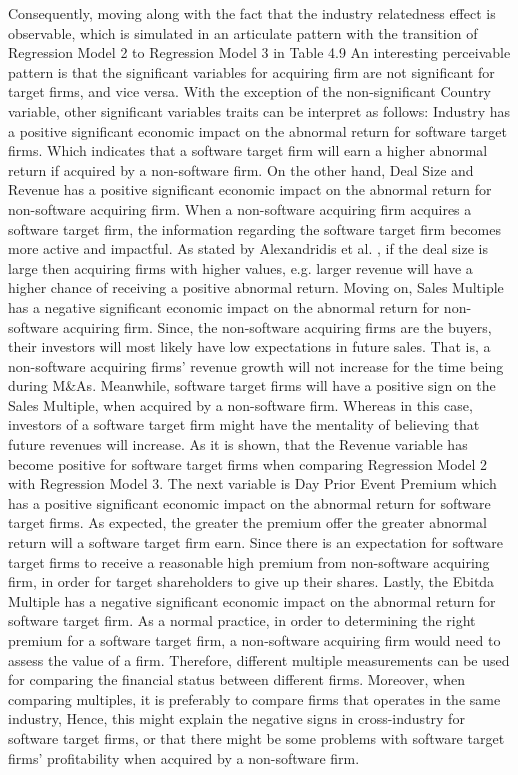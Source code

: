 \documentclass[preprint,10pt]{elsarticle}
\begin{document}
Consequently, moving along with the fact that the industry relatedness effect is observable, which is simulated in an articulate pattern with the transition of Regression Model 2 to Regression Model 3 in Table 4.9 An interesting perceivable pattern is that the significant variables for acquiring firm are not significant for target firms, and vice versa. With the exception of the non-significant Country variable, other significant variables traits can be interpret as follows: Industry  has a positive significant economic impact on the abnormal return for software target firms. Which indicates that a software target firm will earn a higher abnormal return if acquired by a non-software firm. On the other hand, Deal Size and Revenue  has a positive significant economic impact on the abnormal return for non-software acquiring firm. When a non-software acquiring firm acquires a software target firm, the information regarding the software target firm becomes more active and impactful. As stated by Alexandridis et al. \cite{ALEXANDRIDIS2017}, if the deal size is large then acquiring firms with higher values, e.g. larger revenue will have a higher chance of receiving a positive abnormal return. Moving on, Sales Multiple  has a negative significant economic impact on the abnormal return for non-software acquiring firm. Since, the non-software acquiring firms are the buyers, their investors will most likely have low expectations in future sales. That is, a non-software acquiring firms' revenue growth will not increase for the time being during M\&As. Meanwhile, software target firms will have a positive sign on the Sales Multiple, when acquired by a non-software firm. Whereas in this case, investors of a software target firm might have the mentality of believing that future revenues will increase. As it is shown, that the Revenue variable has become positive for software target firms when comparing Regression Model 2 with Regression Model 3. The next variable is Day Prior Event Premium  which has a positive significant economic impact on the abnormal return for software target firms. As expected, the greater the premium offer the greater abnormal return will a software target firm earn. Since there is an expectation for software target firms to receive a reasonable high premium from non-software acquiring firm, in order for target shareholders to give up their shares. Lastly, the Ebitda Multiple  has a negative significant economic impact on the abnormal return for software target firm. As a normal practice, in order to determining the right premium for a software target firm, a non-software acquiring firm would need to assess the value of a firm. Therefore, different multiple measurements can be used for comparing the financial status between different firms. Moreover, when comparing multiples, it is preferably to compare firms that operates in the same industry, Hence, this might explain the negative signs in cross-industry for software target firms, or that there might be some problems with software target firms' profitability when acquired by a non-software firm.
\end{document}
